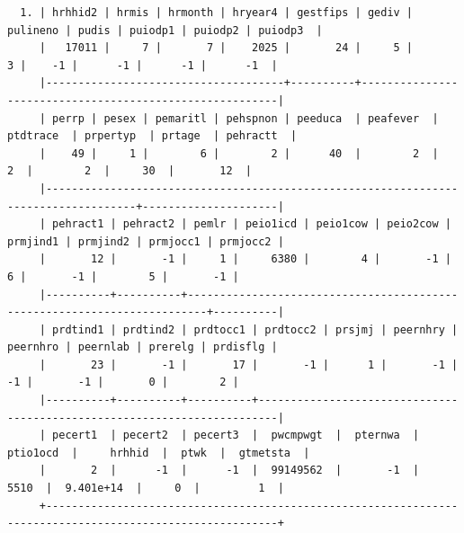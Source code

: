 \documentclass[
]{book}
\begin{document}
\begin{verbatim}
  1. | hrhhid2 | hrmis | hrmonth | hryear4 | gestfips | gediv | pulineno | pudis | puiodp1 | puiodp2 | puiodp3  |
     |   17011 |     7 |       7 |    2025 |       24 |     5 |        3 |    -1 |      -1 |      -1 |      -1  |
     |-------------------------------------+----------+---------------------------------------------------------|
     | perrp | pesex | pemaritl | pehspnon | peeduca  | peafever  | ptdtrace  | prpertyp  | prtage  | pehractt  |
     |    49 |     1 |        6 |        2 |      40  |        2  |        2  |        2  |     30  |       12  |
     |------------------------------------------------------------------------------------+---------------------|
     | pehract1 | pehract2 | pemlr | peio1icd | peio1cow | peio2cow | prmjind1 | prmjind2 | prmjocc1 | prmjocc2 |
     |       12 |       -1 |     1 |     6380 |        4 |       -1 |        6 |       -1 |        5 |       -1 |
     |----------+----------+-------------------------------------------------------------------------+----------|
     | prdtind1 | prdtind2 | prdtocc1 | prdtocc2 | prsjmj | peernhry | peernhro | peernlab | prerelg | prdisflg |
     |       23 |       -1 |       17 |       -1 |      1 |       -1 |       -1 |       -1 |       0 |        2 |
     |----------+----------+----------+-------------------------------------------------------------------------|
     | pecert1  | pecert2  | pecert3  |  pwcmpwgt  |  pternwa  |  ptio1ocd  |     hrhhid  |  ptwk  |  gtmetsta  |
     |       2  |      -1  |      -1  |  99149562  |       -1  |      5510  |  9.401e+14  |     0  |         1  |
     +----------------------------------------------------------------------------------------------------------+


\end{verbatim}
\end{document}
